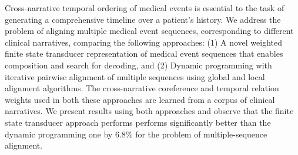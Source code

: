 Cross-narrative temporal ordering of medical events is essential to the task of generating a comprehensive timeline over a patient's history. We address the problem of aligning multiple medical event sequences, corresponding to different clinical narratives, comparing the following approaches: (1) A novel weighted finite state transducer representation of medical event sequences that enables composition and search for decoding, and (2) Dynamic programming with iterative pairwise alignment of multiple sequences using global and local alignment algorithms. The cross-narrative coreference and temporal relation weights used in both these approaches are learned from a corpus of clinical narratives. We present results using both approaches and observe that the finite state transducer approach performs performs significantly better than the dynamic programming one by 6.8\% for the problem of multiple-sequence alignment.
